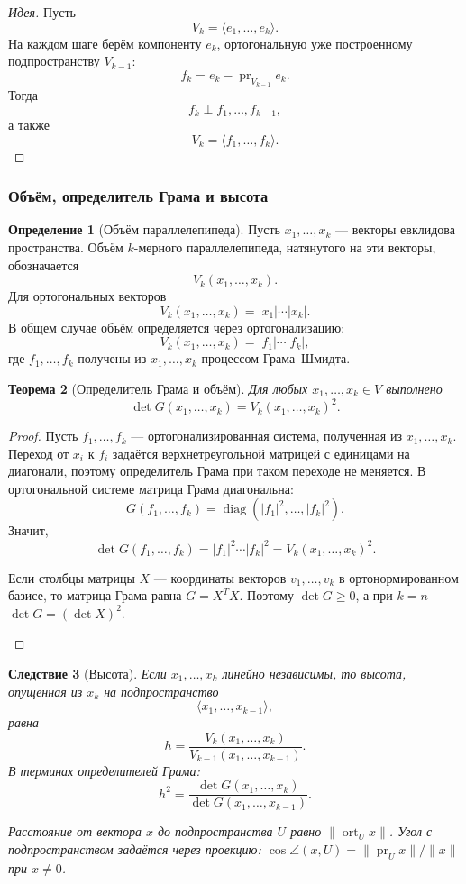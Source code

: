 \documentclass[12pt,a4paper]{article}
\theoremstyle{definition}
\newtheorem{definition}{Определение}[section]
\theoremstyle{plain}
\newtheorem{theorem}[definition]{Теорема}
\newtheorem{corollary}[definition]{Следствие}
\theoremstyle{remark}
\newenvironment{knowledgefix}{\begin{clarifybox}}{\end{clarifybox}}
\newcommand{\diag}{\operatorname{diag}}
\newcommand{\pr}{\operatorname{pr}}
\newcommand{\ort}{\operatorname{ort}}
\begin{document}
\begin{proof}[Идея]
Пусть
\[
    V_k=\langle e_1,\ldots,e_k\rangle.
\]
На каждом шаге берём компоненту $e_k$, ортогональную уже построенному подпространству $V_{k-1}$:
\[
    f_k=e_k-\pr_{V_{k-1}}e_k.
\]
Тогда
\[
    f_k\perp f_1,\ldots,f_{k-1},
\]
а также
\[
    V_k=\langle f_1,\ldots,f_k\rangle.
\]
\end{proof}

\subsubsection{Объём, определитель Грама и высота}


\begin{definition}[Объём параллелепипеда]
Пусть $x_1,\ldots,x_k$ --- векторы евклидова пространства. Объём $k$-мерного параллелепипеда, натянутого на эти векторы, обозначается
\[
    V_k(x_1,\ldots,x_k).
\]
Для ортогональных векторов
\[
    V_k(x_1,\ldots,x_k)=|x_1|\cdots |x_k|.
\]
В общем случае объём определяется через ортогонализацию:
\[
    V_k(x_1,\ldots,x_k)=|f_1|\cdots |f_k|,
\]
где $f_1,\ldots,f_k$ получены из $x_1,\ldots,x_k$ процессом Грама--Шмидта.
\end{definition}

\begin{theorem}[Определитель Грама и объём]
Для любых $x_1,\ldots,x_k\in V$ выполнено
\[
    \det G(x_1,\ldots,x_k)=V_k(x_1,\ldots,x_k)^2.
\]
\end{theorem}

\begin{proof}
Пусть $f_1,\ldots,f_k$ --- ортогонализированная система, полученная из $x_1,\ldots,x_k$.
Переход от $x_i$ к $f_i$ задаётся верхнетреугольной матрицей с единицами на диагонали, поэтому определитель Грама при таком переходе не меняется.
В ортогональной системе матрица Грама диагональна:
\[
    G(f_1,\ldots,f_k)=\diag(|f_1|^2,\ldots,|f_k|^2).
\]
Значит,
\[
    \det G(f_1,\ldots,f_k)=|f_1|^2\cdots |f_k|^2
    =V_k(x_1,\ldots,x_k)^2.
\]
\begin{knowledgefix}
Если столбцы матрицы \(X\) — координаты векторов \(v_1,
\ldots,v_k\) в ортонормированном базисе, то матрица Грама равна \(G=X^TX\). Поэтому \(\det G\ge0\), а при \(k=n\) \(\det G=(\det X)^2\).
\end{knowledgefix}
\end{proof}

\begin{corollary}[Высота]
Если $x_1,\ldots,x_k$ линейно независимы, то высота, опущенная из $x_k$ на подпространство
\[
    \langle x_1,\ldots,x_{k-1}\rangle,
\]
равна
\[
    h=\frac{V_k(x_1,\ldots,x_k)}{V_{k-1}(x_1,\ldots,x_{k-1})}.
\]
В терминах определителей Грама:
\[
    h^2=\frac{\det G(x_1,\ldots,x_k)}{\det G(x_1,\ldots,x_{k-1})}.
\]
\begin{knowledgefix}
Расстояние от вектора \(x\) до подпространства \(U\) равно \(\|\ort_U x\|\). Угол с подпространством задаётся через проекцию: \(\cos\angle(x,U)=\|\pr_Ux\|/\|x\|\) при \(x\ne0\).
\end{knowledgefix}
\end{corollary}
\end{document}
